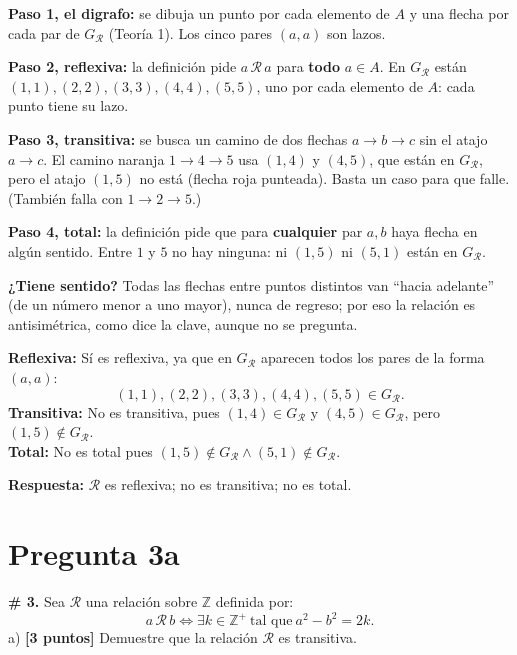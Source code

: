 \documentclass[11pt]{article}
\newcommand{\R}{\mathcal R}
\newcommand{\hl}[1]{\colorbox{green!35}{#1}}
\begin{document}
\begin{explica}
\textbf{Paso 1, el digrafo:} se dibuja un punto por cada elemento de $A$ y una flecha por cada par de $G_\R$ (Teoría 1). Los cinco pares $(a,a)$ son lazos.

\textbf{Paso 2, reflexiva:} la definición pide $a\,\R\,a$ para \textbf{todo} $a\in A$. En $G_\R$ están $(1,1),(2,2),(3,3),(4,4),(5,5)$, uno por cada elemento de $A$: cada punto tiene su lazo.

\textbf{Paso 3, transitiva:} se busca un camino de dos flechas $a\to b\to c$ sin el atajo $a\to c$. El camino naranja $1\to4\to5$ usa $(1,4)$ y $(4,5)$, que están en $G_\R$, pero el atajo $(1,5)$ no está (flecha roja punteada). Basta un caso para que falle. (También falla con $1\to2\to5$.)

\textbf{Paso 4, total:} la definición pide que para \textbf{cualquier} par $a,b$ haya flecha en algún sentido. Entre $1$ y $5$ no hay ninguna: ni $(1,5)$ ni $(5,1)$ están en $G_\R$.

\textbf{¿Tiene sentido?} Todas las flechas entre puntos distintos van ``hacia adelante'' (de un número menor a uno mayor), nunca de regreso; por eso la relación es antisimétrica, como dice la clave, aunque no se pregunta.
\end{explica}

\textbf{Reflexiva:} Sí es reflexiva, ya que en $G_\R$ aparecen todos los pares de la forma $(a,a)$:
\[(1,1),(2,2),(3,3),(4,4),(5,5)\in G_\R.\]
\textbf{Transitiva:} No es transitiva, pues $(1,4)\in G_\R$ y $(4,5)\in G_\R$, pero $(1,5)\notin G_\R$.\\
\textbf{Total:} No es total pues $(1,5)\notin G_\R\wedge(5,1)\notin G_\R$.

\textbf{Respuesta:} $\R$ es reflexiva; no es transitiva; no es total.

\clearpage
\section*{Pregunta 3a}

\textbf{\# 3.} Sea $\R$ una relación sobre $\mathbb Z$ definida por:
\[a\,\R\,b\iff\exists k\in\mathbb Z^+\ \text{tal que}\ a^2-b^2=2k.\]
a) \textbf{[3 puntos]} Demuestre que la relación $\R$ es \hl{transitiva}.

\begin{center}
\end{center}
\end{document}
